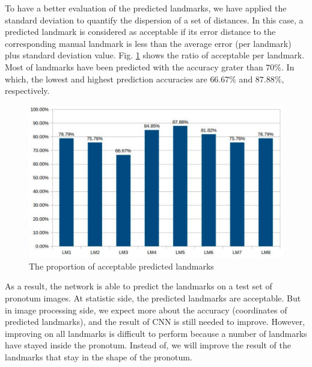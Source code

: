 \documentclass[10pt]{article}
\begin{document}
To have a better evaluation of the predicted landmarks, we have applied the standard deviation \cite{bland1996statistics} to quantify the dispersion of a set of distances. In this case, a predicted landmark is considered as acceptable if its error distance to the corresponding manual landmark is less than the average error (per landmark) plus standard deviation value. Fig. \ref{figchart} shows the ratio of acceptable per landmark. Most of landmarks have been predicted with the accuracy grater than \textbf{$70\%$}. In which, the lowest and highest prediction accuracies are \textbf{$66.67\%$} and \textbf{$87.88\%$}, respectively.

\begin{figure}[htbp]
	\centerline{\includegraphics[scale=0.2]{images/chart}}
	\caption{The proportion of acceptable predicted landmarks}
	\label{figchart}
\end{figure}

As a result, the network is able to predict the landmarks on a test set of pronotum images. At statistic side, the predicted landmarks are acceptable. But in image processing side, we expect more about the accuracy (coordinates of predicted landmarks), and the result of CNN is still needed to improve. However, improving on all landmarks is difficult to perform because a number of landmarks have stayed inside the pronotum. Instead of, we will improve the result of the landmarks that stay in the shape of the pronotum.
\end{document}

